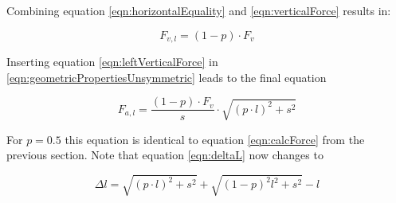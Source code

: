 Combining equation \ref{eqn:horizontalEquality} and \ref{eqn:verticalForce} results in:

\begin{equation}
	F_{v,l} = (1-p)\cdot F_v
	\label{eqn:leftVerticalForce}
\end{equation}

Inserting equation \ref{eqn:leftVerticalForce} in \ref{eqn:geometricPropertiesUnsymmetric} leads to the final equation

\begin{equation}
	F_{a,l} = \frac{(1-p)\cdot F_v}{s}\cdot \sqrt{(p\cdot l)^2 + s^2}
\end{equation}

For $p = 0.5$ this equation is identical to equation \ref{eqn:calcForce} from the previous section. Note that equation \ref{eqn:deltaL} now changes to

\begin{equation}
	\Delta l = \sqrt{ (p\cdot l)^2 + s^2 } + \sqrt{ (1-p)^2 l^2 + s^2 } - l
\end{equation}






